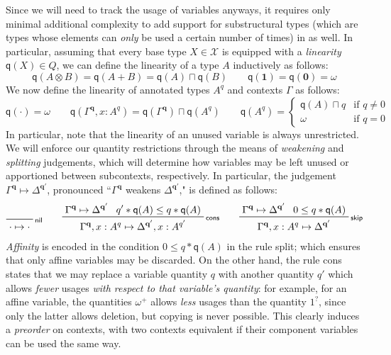 \documentclass[acmsmall,screen,review]{acmart}
\newcommand{\mc}[1]{\ensuremath{\mathcal{#1}}}
\newcommand{\mb}[1]{\ensuremath{\mathbf{#1}}}
\newcommand{\ms}[1]{\ensuremath{\mathsf{#1}}}
\newcommand{\cwk}[2]{#1 \mapsto #2}
\newcommand{\rle}[1]{{\scriptsize\textsf{#1}}}
\newcommand{\brle}[1]{{\textsf{#1}}}
\newcommand{\zeroq}{0}
\newcommand{\delq}{1^?}
\newcommand{\cpyq}{\omega^+}
\newcommand{\topq}{\omega}
\newcommand{\alquant}{\ms{q}}
\begin{document}
Since we will need to track the usage of variables anyways, it requires only minimal additional
complexity to add support for substructural types (which are types whose elements can \emph{only} be used a
certain number of times) in as well. In particular, assuming that every base type $X \in \mc{X}$ is
equipped with a \emph{linearity} $\alquant(X) \in Q$, we can define the linearity of a type $A$
inductively as follows:
\begin{equation}
  \alquant(A \otimes B) = \alquant(A + B) = \alquant(A) \sqcap \alquant(B) \qquad
  \alquant(\mb{1}) = \alquant(\mb{0}) = \topq
\end{equation}
We now define the linearity of annotated types $A^q$ and contexts $\Gamma$ as follows:
\begin{equation}
  \alquant(\cdot) = \topq \qquad
  \alquant(\Gamma^{\mb{q}}, x : A^q) 
    = \alquant(\Gamma^{\mb{q}}) \sqcap \alquant(A^q) \qquad 
  \alquant(A^q) = \begin{cases}
    \alquant(A) \sqcap q & \text{if } q \neq 0 \\
    \topq & \text{if } q = 0
  \end{cases}
\end{equation}
In particular, note that the linearity of an unused variable is always unrestricted.
%
We will enforce our quantity restrictions through the means of \emph{weakening} and \emph{splitting}
judgements, which will determine how variables may be left unused or apportioned between
subcontexts, respectively. In particular, the judgement $\cwk{\Gamma^{\mb{q}}}{\Delta^{\mb{q}'}}$,
pronounced ``$\Gamma^{\mb{q}}$ weakens $\Delta^{\mb{q'}}$," is defined as follows:
\begin{gather*}
  \prftree[r]{\rle{nil}}{\cwk{\cdot}{\cdot}} \qquad 
  \prftree[r]{\rle{cons}}
    {\cwk{\Gamma^{\mb{q}}}{\Delta^{\mb{q}'}}}
    {q' * \alquant(A) \leq q * \alquant(A)}
    {\cwk{\Gamma^{\mb{q}}, x : A^q}
         {\Delta^{\mb{q}'}, x : A^{q'}}} \qquad
  \prftree[r]{\rle{skip}}
    {\cwk{\Gamma^{\mb{q}}}{\Delta^{\mb{q}'}}}
    {\zeroq \leq q * \alquant(A)}
    {\cwk{\Gamma^{\mb{q}}, x : A^q}{\Delta}^{\mb{q}'}}
\end{gather*}
\emph{Affinity} is encoded in the condition $\zeroq \leq q * \alquant(A)$ in the rule \brle{split};
which ensures that only affine variables may be discarded. On the other hand, the rule \brle{cons}
states that we may replace a variable quantity $q$ with another quantity $q'$ which allows
\emph{fewer} usages \emph{with respect to that variable's quantity}: for example, for an affine
variable, the quantities $\cpyq$ allows \emph{less} usages than the quantity $\delq$, since only the
latter allows deletion, but copying is never possible. This clearly induces a \emph{preorder} on
contexts, with two contexts equivalent if their component variables can be used the same way.
\end{document}

